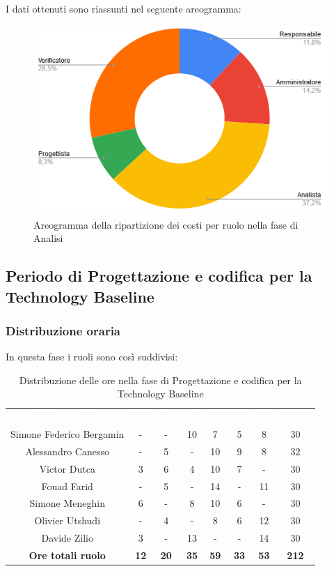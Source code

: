 I dati ottenuti sono riassunti nel seguente areogramma:
\begin{figure}[H]
\centering
\includegraphics[scale=0.60]{img/grafici/torta_fase_analisi_prospetto_economico.png}
\caption{Areogramma della ripartizione dei costi per ruolo nella fase di Analisi}
\end{figure}
 
 
\subsection{Periodo di Progettazione e codifica per la Technology Baseline}
\subsubsection{Distribuzione oraria}
In questa fase i ruoli sono così suddivisi:
\begin{table}[H]
\centering\renewcommand{\arraystretch}{1.5}
\caption{Distribuzione delle ore nella fase di Progettazione e codifica per la Technology Baseline}
\vspace{0.2cm}
\begin{tabular}{ c c c c c c c c }
\rowcolor{redafk}
\textcolor{white}{\textbf{Nominativo}} & \textcolor{white}{\textbf{Re}} &
\textcolor{white}{\textbf{Am}} & \textcolor{white}{\textbf{An}} &
\textcolor{white}{\textbf{Pt}} & \textcolor{white}{\textbf{Pm}} &
\textcolor{white}{\textbf{Ve}} & \textcolor{white}{\textbf{Totale}} \\
Simone Federico Bergamin & - & - & 10 & 7 & 5 & 8 & 30 \\
Alessandro Canesso & - & 5 & - & 10 & 9 & 8 & 32 \\
Victor Dutca & 3 & 6 & 4 & 10 & 7 & - & 30 \\
Fouad Farid & - & 5 & - & 14 & - & 11 & 30 \\
Simone Meneghin & 6 & - & 8 & 10 & 6 & - & 30 \\
Olivier Utshudi & - & 4 & - & 8 & 6 & 12 & 30 \\
Davide Zilio & 3 & - & 13 & - & - & 14 & 30 \\
\rowcolor{lastrowcolor}
\textbf{Ore totali ruolo} & \textbf{12} & \textbf{20} & \textbf{35} & \textbf{59} & \textbf{33} & \textbf{53} & \textbf{212} \\
\end{tabular}
\end{table}
 
